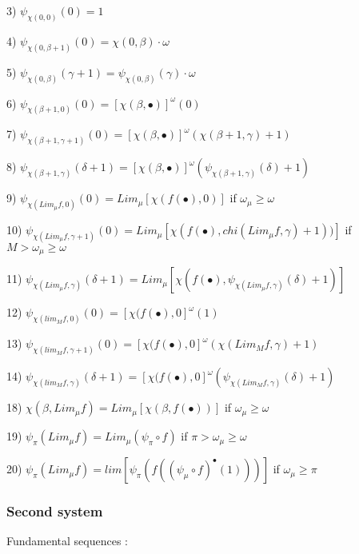 \documentclass[10pt]{article}
\begin{document}
\bigskip

3) \( \psi_{\chi(0,0)}(0) = 1 \)

4) \( \psi_{\chi(0,\beta+1)}(0) = \chi(0,\beta) \cdot \omega \)

5) \( \psi_{\chi(0,\beta)}(\gamma+1) = \psi_{\chi(0,\beta)}(\gamma) \cdot \omega \)

\bigskip

6) \( \psi_{\chi(\beta+1,0)}(0) = [\chi(\beta,\bullet)]^\omega (0) \)

7) \( \psi_{\chi(\beta+1,\gamma+1)}(0) = [\chi(\beta,\bullet)]^\omega (\chi(\beta+1,\gamma)+1) \)

8) \( \psi_{\chi(\beta+1,\gamma)}(\delta+1) = [\chi(\beta,\bullet)]^\omega (\psi_{\chi(\beta+1,\gamma)}(\delta)+1) \)

\bigskip

9) \( \psi_{\chi(Lim_\mu f,0)}(0) = Lim_\mu [\chi(f(\bullet),0)] \) if \( \omega_\mu \ge \omega \)

10) \( \psi_{\chi(Lim_\mu f,\gamma+1)}(0) = Lim_\mu [\chi(f(\bullet),chi(Lim_\mu f,\gamma)+1))] \) if \( M > \omega_\mu \ge \omega \)

11) \( \psi_{\chi(Lim_\mu f,\gamma)}(\delta+1) = Lim_\mu [\chi(f(\bullet),\psi_{\chi(Lim_\mu f,\gamma)}(\delta)+1)] \)

\bigskip

12) \( \psi_{\chi(lim_M f,0)}(0) = [\chi(f(\bullet),0]^\omega (1) \)

13) \( \psi_{\chi(lim_M f,\gamma+1)}(0) = [\chi(f(\bullet),0]^\omega (\chi(Lim_M f,\gamma)+1) \)

14) \( \psi_{\chi(lim_M f,\gamma)}(\delta+1) = [\chi(f(\bullet),0]^\omega (\psi_{\chi(Lim_M f,\gamma)}(\delta)+1) \)

\bigskip

18) \( \chi(\beta,Lim_\mu f) = Lim_\mu [\chi(\beta,f(\bullet))] \) if \( \omega_\mu \ge \omega \)

19) \( \psi_\pi(Lim_\mu f) = Lim_\mu (\psi_\pi \circ f) \) if \( \pi > \omega_\mu \ge \omega \)

20) \( \psi_\pi(Lim_\mu f) = lim [ \psi_\pi(f((\psi_\mu \circ f)^\bullet(1))) ] \) if \( \omega_\mu \ge \pi \)


\bigskip

\subsubsection{Second system}

Fundamental sequences :
\end{document}
